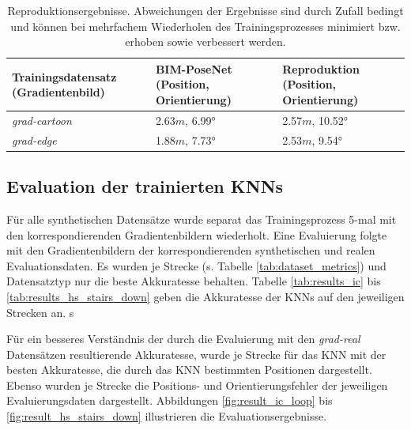 \begin{table}
	\centering
	\caption{Reproduktionsergebnisse. Abweichungen der Ergebnisse sind durch Zufall bedingt und können bei mehrfachem Wiederholen des Trainingsprozesses minimiert bzw. erhoben sowie verbessert werden. }
	\begin{tabularx}{1.0\textwidth}{X X X}
		\textbf{Trainingsdatensatz} \hspace{2cm} (Gradientenbild) & \textbf{BIM-PoseNet} \hspace{2cm} (Position, Orientierung) & \textbf{Reproduktion} \hspace{2cm} (Position, Orientierung)\\
		\hline
	 \textit{grad-cartoon} & 2.63$m$, 6.99° & 2.57$m$, 10.52°\\
		\hline
		\textit{grad-edge} & 1.88$m$, 7.73°  & 2.53$m$, 9.54°\\
	\end{tabularx}
	\label{tab:reproduction}
\end{table}





\subsection{Evaluation der trainierten KNNs}
Für alle synthetischen Datensätze wurde separat das Trainingsprozess 5-mal mit den korrespondierenden Gradientenbildern wiederholt. Eine Evaluierung folgte mit den Gradientenbildern der korrespondierenden synthetischen und realen Evaluationsdaten. Es wurden je Strecke (s. Tabelle \ref{tab:dataset_metrics}) und Datensatztyp nur die beste Akkuratesse behalten. Tabelle \ref{tab:results_ic} bis \ref{tab:results_hs_stairs_down} geben die Akkuratesse der KNNs auf den jeweiligen Strecken an. 
s

Für ein besseres Verständnis der durch die Evaluierung mit den \textit{grad-real} Datensätzen resultierende Akkuratesse, wurde je Strecke für das KNN mit der besten Akkuratesse, die durch das KNN bestimmten Positionen dargestellt. Ebenso wurden je Strecke die Positions- und Orientierungsfehler der jeweiligen Evaluierungsdaten dargestellt. Abbildungen \ref{fig:result_ic_loop} bis \ref{fig:result_hs_stairs_down} illustrieren die Evaluationsergebnisse.


